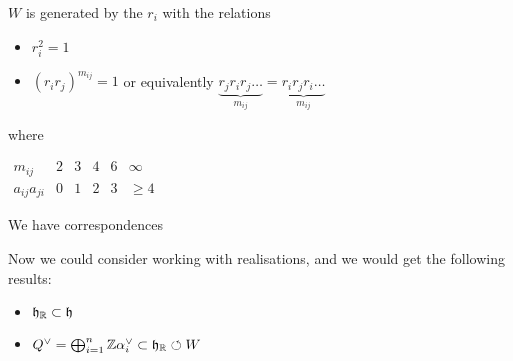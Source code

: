 \documentclass{article}
\begin{document}
\begin{prop}
$W$ is generated by the $r_i$ with the relations 
\begin{itemize}
    \item $r_i^2=1$
    \item $(r_i r_j)^{m_{ij}}=1$ or equivalently $\underbrace{r_j r_i r_j \dots}_{m_{ij}} = \underbrace{r_i r_j r_i \dots}_{m_{ij}}$
\end{itemize}
where 
\begin{center}
    $\begin{array}{c||c|c|c|c|c}
    m_{ij} & 2 & 3 & 4 & 6 & \infty \\ \hline
a_{ij} a_{ji} & 0 & 1 & 2 & 3 & \geq 4
    \end{array}$
\end{center}
\end{prop}

\begin{example}
We have correspondences 
\end{example}

Now we could consider working with realisations, and we would get the following results:
\begin{itemize}
    \item $\mathfrak{h}_{\mathbb{R}} \subset \mathfrak{h}$
    \item $Q^\vee = \bigoplus_{i=1}^n \mathbb{Z} \alpha_i^\vee \subset \mathfrak{h}_{\mathbb{R}} \circlearrowleft W$
\end{itemize}
\end{document}
